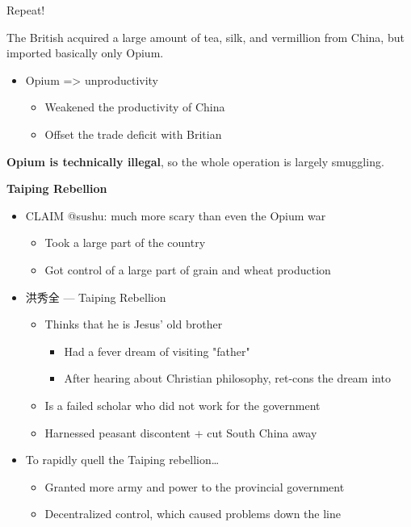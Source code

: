 \documentclass[letterpaper]{article}
\begin{document}
Repeat!

The British acquired a large amount of tea, silk, and vermillion from
China, but imported basically only Opium.

\begin{itemize}
\item Opium => unproductivity

\begin{itemize}
\item Weakened the productivity of China
\item Offset the trade deficit with Britian
\end{itemize}
\end{itemize}

\textbf{Opium is technically illegal}, so the whole operation is largely
smuggling.

\textbf{Taiping Rebellion}

\begin{itemize}
\item CLAIM @sushu: much more scary than even the Opium war

\begin{itemize}
\item Took a large part of the country
\item Got control of a large part of grain and wheat production
\end{itemize}

\item 洪秀全 --- Taiping Rebellion

\begin{itemize}
\item Thinks that he is Jesus' old brother

\begin{itemize}
\item Had a fever dream of visiting "father"
\item After hearing about Christian philosophy, ret-cons the dream into
\end{itemize}

\item Is a failed scholar who did not work for the government
\item Harnessed peasant discontent + cut South China away
\end{itemize}

\item To rapidly quell the Taiping rebellion\ldots{}

\begin{itemize}
\item Granted more army and power to the provincial government
\item Decentralized control, which caused problems down the line
\end{itemize}
\end{itemize}
\end{document}
